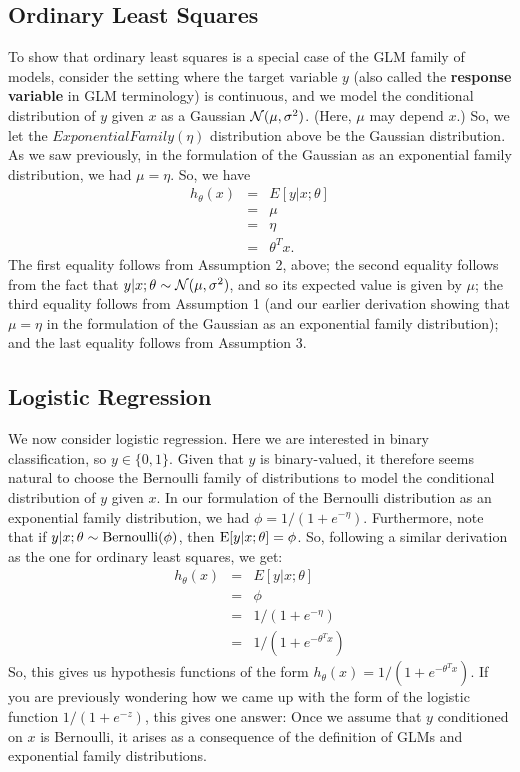 \documentclass{article}
\begin{document}
\subsection{Ordinary Least Squares}

To show that ordinary least squares is a special case of the GLM family of
models, consider the setting where the target variable $y$ (also called the {\bf response variable}
in GLM terminology) is continuous, and we model the conditional
distribution of $y$ given $x$ as a Gaussian ${\cal N}(\mu,\sigma^2)$.
(Here, $\mu$ may depend $x$.)  So, we let the $ExponentialFamily(\eta)$
distribution above be the Gaussian distribution.  As we saw previously, in
the formulation of the Gaussian as an exponential family distribution, we had
$\mu = \eta$.  So, we have
\begin{eqnarray*}
h_\theta(x) &=& E[y|x;\theta] \\
&=& \mu \\
&=& \eta \\
&=& \theta^Tx.
\end{eqnarray*}
The first equality follows from Assumption 2, above; the second equality follows
from the fact that $y | x;\theta \sim {\cal N}(\mu,\sigma^2)$, and so its expected
value is given by $\mu$; the third equality follows from Assumption 1 (and our earlier
derivation showing that $\mu=\eta$ in the formulation of the Gaussian as
an exponential family distribution); and the
last equality follows from Assumption 3.

\subsection{Logistic Regression}

We now consider logistic regression.  Here we are interested in binary
classification, so $y \in \{0,1\}$.  Given that $y$ is binary-valued, it therefore seems natural to choose
the Bernoulli family of distributions to model the conditional distribution of
$y$ given $x$.  In our formulation of the Bernoulli distribution as an exponential
family distribution, we had $\phi = 1/(1+e^{-\eta})$.  Furthermore, note
that if $y|x;\theta \sim {\rm Bernoulli}(\phi)$, then
${\rm E}[y|x;\theta] = \phi$.  So, following a similar derivation as the one for
ordinary least squares, we get:
\begin{eqnarray*}
h_\theta(x) &=& E[y|x;\theta] \\
&=& \phi \\
&=& 1/(1+e^{-\eta}) \\
&=& 1/(1+e^{-\theta^Tx})
\end{eqnarray*}
So, this gives us hypothesis functions of the form $h_\theta(x) = 1/(1+e^{-\theta^Tx})$.
If you are previously wondering how we came up with the form of the
logistic function $1/(1+e^{-z})$, this gives one answer:  Once we
assume that $y$ conditioned on $x$ is Bernoulli, it arises as
a consequence of the definition of GLMs and exponential family distributions.
\end{document}

